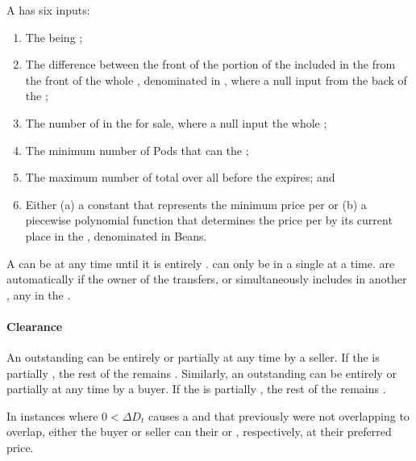 \documentclass[class=article, crop=false]{standalone}
\begin{document}
A  has six inputs: 
\begin{enumerate}
        \item The  being ;
        \item The difference between the front of the portion of the  included in the  from the front of the whole , denominated in , where a null input  from the back of the ;
        \item The number of  in the  for sale, where a null input  the whole ;
        \item The minimum number of Pods that can  the ; 
        \item The maximum number of total   over all  before the  expires; and
        \item Either (a) a constant that represents the minimum price per  or (b) a piecewise polynomial function that determines the price per  by its current place in the , denominated in Beans.
\end{enumerate}

A  can be  at any time until it is entirely .  can only be  in a single  at a time.  are automatically  if the owner of the  transfers, or simultaneously includes in another , any  in the .

\paragraph{Clearance}

An outstanding  can be entirely or partially  at any time by a  seller. If the  is partially , the rest of the  remains . Similarly, an outstanding  can be entirely or partially  at any time by a  buyer. If the  is partially , the rest of the  remains .

In instances where $0 < \Delta D_t$ causes a  and  that previously were not overlapping to overlap, either the buyer or seller can  their  or , respectively, at their preferred price. 
\end{document}
